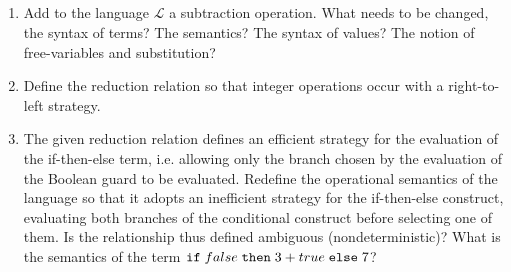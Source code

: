 \subsection{}

\begin{enumerate}
	\item Add to the language $\mathcal{L}$ a subtraction operation.
	      What needs to be changed, the syntax of terms? The semantics?
	      The syntax of values? The notion of free-variables and substitution?
	\item Define the reduction relation so that integer operations occur with a
	      right-to-left strategy.
	\item The given reduction relation defines an efficient strategy for the
	      evaluation of the if-then-else term, i.e. allowing only the branch chosen
	      by the evaluation of the Boolean guard to be evaluated. Redefine the
	      operational semantics of the language so that it adopts an inefficient
	      strategy for the if-then-else construct, evaluating both branches of the
	      conditional construct before selecting one of them. Is the relationship
	      thus defined ambiguous (nondeterministic)?
	      What is the semantics of the term $\texttt{if}\;false\;\texttt{then}\;3+true\;\texttt{else}\;7$?
\end{enumerate}

